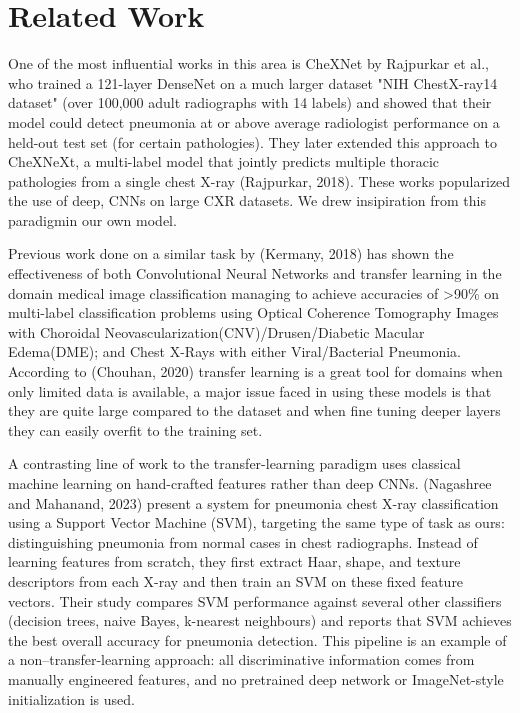 \documentclass[11pt]{article}
\begin{document}
\section{Related Work}


One of the most influential works in this area is CheXNet by Rajpurkar et al., who trained a 121-layer DenseNet on a much larger dataset "NIH ChestX-ray14 dataset" (over 100,000 adult radiographs with 14 labels) and showed that their model could detect pneumonia at or above average radiologist performance on a held-out test set (for certain pathologies). They later extended this approach to CheXNeXt, a multi-label model that jointly predicts multiple thoracic pathologies from a single chest X-ray (Rajpurkar, 2018). These works popularized the use of deep, CNNs on large CXR datasets. We drew insipiration from this paradigmin our own model.


Previous work done on a similar task by (Kermany, 2018) has shown the effectiveness of both Convolutional Neural Networks and transfer learning in the domain medical image classification managing to achieve accuracies of >90\% on multi-label classification problems using Optical Coherence Tomography Images with Choroidal Neovascularization(CNV)/Drusen/Diabetic Macular Edema(DME); and Chest X-Rays with either Viral/Bacterial Pneumonia.  According to (Chouhan, 2020) transfer learning is a great tool for domains when only limited data is available, a major issue faced in using these models is that they are quite large compared to the dataset and when fine tuning deeper layers they can easily overfit to the training set. 


A contrasting line of work to the transfer-learning paradigm uses classical machine learning on hand-crafted features rather than deep CNNs. (Nagashree and Mahanand, 2023) present a system for pneumonia chest X-ray classification using a Support Vector Machine (SVM), targeting the same type of task as ours: distinguishing pneumonia from normal cases in chest radiographs. Instead of learning features from scratch, they first extract Haar, shape, and texture descriptors from each X-ray and then train an SVM on these fixed feature vectors. Their study compares SVM performance against several other classifiers (decision trees, naive Bayes, k-nearest neighbours) and reports that SVM achieves the best overall accuracy for pneumonia detection. This pipeline is an example of a non–transfer-learning approach: all discriminative information comes from manually engineered features, and no pretrained deep network or ImageNet-style initialization is used.
\end{document}
